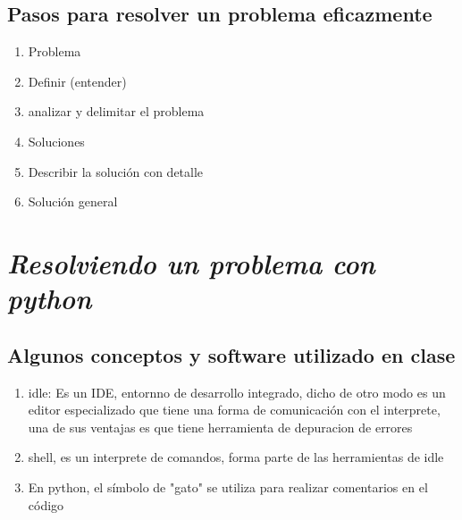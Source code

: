 \documentclass{book}
\begin{document}
   	\subsection {Pasos para resolver un problema eficazmente}
   	\begin{enumerate}
   		\item Problema
   		\item Definir (entender)
   		\item analizar y delimitar el problema
   		\item Soluciones
   		\item Describir la solución con detalle
   		\item Solución general
   	\end{enumerate}
   	



\section{\textit{Resolviendo un problema con python}}%
\begin{flushright}
	\date{10 de enero de 2019}
\end{flushright}


	\subsection {Algunos conceptos y software utilizado en clase}%
	\begin{enumerate}
		\item idle: Es un IDE, entornno de desarrollo integrado, dicho de otro modo es un editor especializado que tiene una forma de comunicación con el interprete, una de sus ventajas es que tiene herramienta de depuracion de errores
		\item shell, es un interprete de comandos, forma parte de las herramientas de idle
		\item En python, el símbolo de "gato" se utiliza para realizar comentarios en el código
	\end{enumerate}
	
\end{document}
